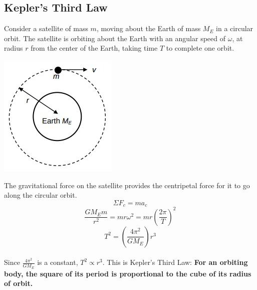 \documentclass{article}
\begin{document}
\subsection{Kepler's Third Law}
Consider a satellite of mass $m$, moving about the Earth of mass $M_E$ in a circular orbit. The satellite is orbiting about the Earth with an angular speed of $\omega$,
at radius $r$ from the center of the Earth, taking time $T$ to complete one orbit.
\begin{center}
    \includegraphics[scale=0.6]{assets/keplerDiagram2.png}
\end{center}\leavevmode
The gravitational force on the satellite provides the centripetal force for it to go along the circular orbit.
\begin{equation}
    \Sigma F_c=ma_c
\end{equation}
\begin{equation}
    \frac{GM_Em}{r^2}=mr\omega^2=mr(\frac{2\pi}{T})^2
\end{equation}
\begin{equation}
    T^2=(\frac{4\pi^2}{GM_E})r^3
\end{equation}
\\Since $\frac{4\pi^2}{GM_E}$ is a constant, $T^2 \propto r^3$. This is Kepler's Third Law: \textbf{For an orbiting body, the square of its period is proportional to the cube of its radius of orbit.} 
\end{document}
